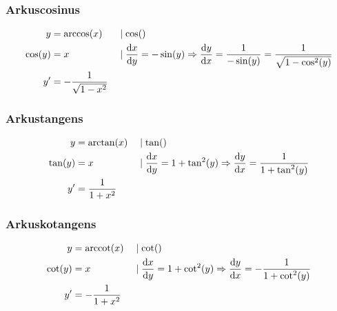 \subsubsection{Arkuscosinus}

\begin{align*}
	y       & = \arccos(x)                &  & \mid \cos()                                                                                                                       \\
	\cos(y) & = x                         &  & \mid \frac{\mathop{}\!\mathrm{d} x}{\mathop{}\!\mathrm{d} y} = -\sin(y) \Rightarrow \frac{\mathop{}\!\mathrm{d} y}{\mathop{}\!\mathrm{d} x} = \frac{1}{-\sin(y)} = \frac{1}{\sqrt{1 - \cos^2(y)}} \\
	y'      & = -\frac{1}{\sqrt{1 - x^2}}
\end{align*}

\subsubsection{Arkustangens}

\begin{align*}
	y       & = \arctan(x)        &  & \mid \tan()                                                                                                \\
	\tan(y) & = x                 &  & \mid \frac{\mathop{}\!\mathrm{d} x}{\mathop{}\!\mathrm{d} y} = 1 + \tan^2(y) \Rightarrow \frac{\mathop{}\!\mathrm{d} y}{\mathop{}\!\mathrm{d} x} = \frac{1}{1 + \tan^2(y)} \\
	y'      & = \frac{1}{1 + x^2}
\end{align*}

\subsubsection{Arkuskotangens}

\begin{align*}
	y       & = \operatorname{arccot}(x)         &  & \mid \cot()                                                                                                 \\
	\cot(y) & = x                  &  & \mid \frac{\mathop{}\!\mathrm{d} x}{\mathop{}\!\mathrm{d} y} = 1 + \cot^2(y) \Rightarrow \frac{\mathop{}\!\mathrm{d} y}{\mathop{}\!\mathrm{d} x} = -\frac{1}{1 + \cot^2(y)} \\
	y'      & = -\frac{1}{1 + x^2}
\end{align*}

